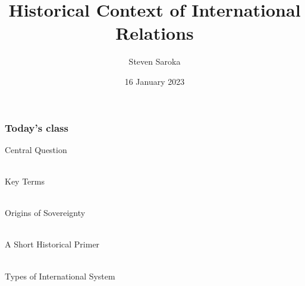 \documentclass{beamer}
\title[Historical Context]{\LARGE{Historical Context of International Relations}}
\author[POLI 150]{Steven Saroka}
\institute{POLI 150}
\date{16 January 2023}
\begin{document}
\begin{frame}
\titlepage %
\end{frame}





\begin{frame} 
	\frametitle{\LARGE{Today's class}}
	\begin{itemize}
		\Large{
			\item Central Question
			\\~\\ 
			\item Key Terms
			\\~\\
			\item Origins of Sovereignty
			\\~\\
			\item A Short Historical Primer
			\\~\\
			\item Types of International System
		}
	\end{itemize}
\end{frame}

\end{document}
